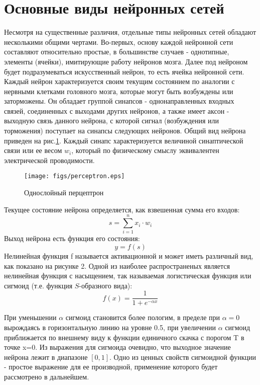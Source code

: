 \documentclass[a4paper,12pt]{report}
\begin{document}
\section{Основные виды нейронных сетей}
Несмотря на существенные различия, отдельные типы нейронных сетей обладают несколькими общими чертами. Во-первых, основу каждой нейронной сети составляют относительно простые, в большинстве случаев - однотипные, элементы (ячейки), имитирующие работу нейронов мозга. Далее под нейроном будет подразумеваться искусственный нейрон, то есть ячейка нейронной сети. Каждый нейрон характеризуется своим текущим состоянием по аналогии с нервными клетками головного мозга, которые могут быть возбуждены или заторможены. Он обладает группой синапсов - однонаправленных входных связей, соединенных с выходами других нейронов, а также имеет аксон - выходную связь данного нейрона, с которой сигнал (возбуждения или торможения) поступает на синапсы следующих нейронов. Общий вид нейрона приведен на рис.\ref{perceptron}. Каждый синапс характеризуется величиной синаптической связи или ее весом $w_i$, который по физическому смыслу эквивалентен электрической проводимости.

\begin{center}
\begin{figure}[!ht]
\begin{center}
\texttt{[image: figs/perceptron.eps]}
\end{center}
\caption{Однослойный перцептрон}
\label{perceptron}
\end{figure}
\end{center}

Текущее состояние нейрона определяется, как взвешенная сумма его входов: 
\begin{equation}
s=\sum_{i=1}^n x_i\cdot w_i
\end{equation}
Выход нейрона есть функция его состояния: 
\begin{equation}
y = f(s) 
\end{equation}
Нелинейная функция f называется активационной и может иметь различный вид, как показано на рисунке 2. Одной из наиболее распространеных является нелинейная функция с насыщением, так называемая логистическая функция или сигмоид (т.е. функция $S$-образного вида): 
\begin{equation}
f(x)=\frac{1}{1+e^{-\alpha x}}
\end{equation}

При уменьшении $\alpha$ сигмоид становится более пологим, в пределе при $\alpha = 0$ вырождаясь в горизонтальную линию на уровне 0.5, при увеличении $\alpha$ сигмоид приближается по внешнему виду к функции единичного скачка с порогом T в точке x=0. Из выражения для сигмоида очевидно, что выходное значение нейрона лежит в диапазоне $[0,1]$. Одно из ценных свойств сигмоидной функции - простое выражение для ее производной, применение которого будет рассмотрено в дальнейшем. 
\end{document}
